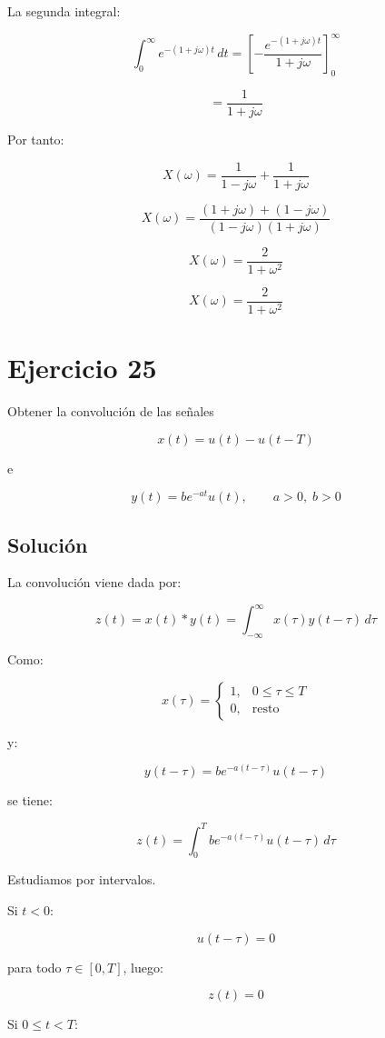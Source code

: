 \documentclass[fleqn]{article}
\begin{document}
	La segunda integral:

	\[
	\int_{0}^{\infty}
	e^{-(1+j\omega)t}\,dt
	=
	\left[
	-\frac{e^{-(1+j\omega)t}}{1+j\omega}
	\right]_{0}^{\infty}
	\]

	\[
	=
	\frac{1}{1+j\omega}
	\]

	Por tanto:

	\[
	X(\omega)
	=
	\frac{1}{1-j\omega}
	+
	\frac{1}{1+j\omega}
	\]

	\[
	X(\omega)
	=
	\frac{(1+j\omega)+(1-j\omega)}
	{(1-j\omega)(1+j\omega)}
	\]

	\[
	X(\omega)
	=
	\frac{2}{1+\omega^2}
	\]

	\[
	\boxed{
	X(\omega)
	=
	\frac{2}{1+\omega^2}
	}
	\]

\section{Ejercicio 25}
	Obtener la convolución de las señales

	\[
	x(t)=u(t)-u(t-T)
	\]

	e

	\[
	y(t)=be^{-at}u(t),
	\qquad a>0,\; b>0
	\]

	\subsection{Solución}

	La convolución viene dada por:

	\[
	z(t)
	=
	x(t)*y(t)
	=
	\int_{-\infty}^{\infty}
	x(\tau)y(t-\tau)\,d\tau
	\]

	Como:

	\[
	x(\tau)=
	\begin{cases}
	1, & 0\leq\tau\leq T \\[1mm]
	0, & \text{resto}
	\end{cases}
	\]

	y:

	\[
	y(t-\tau)
	=
	be^{-a(t-\tau)}u(t-\tau)
	\]

	se tiene:

	\[
	z(t)
	=
	\int_0^T
	be^{-a(t-\tau)}u(t-\tau)\,d\tau
	\]

	Estudiamos por intervalos.

	Si $t<0$:

	\[
	u(t-\tau)=0
	\]

	para todo $\tau\in[0,T]$, luego:

	\[
	z(t)=0
	\]

	Si $0\leq t<T$:
\end{document}
